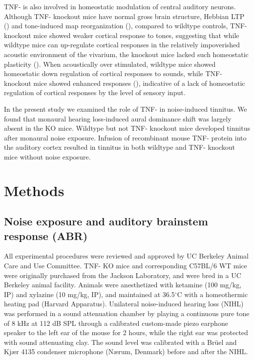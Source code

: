 TNF-\textalpha{} is also involved in homeostatic modulation of central auditory neurons. Although TNF-\textalpha{} knockout mice have normal gross brain structure, Hebbian LTP (\cite{Kaneko2008}) and tone-induced map reorganization (\cite{Yang2013}), compared to wildtype controls, TNF-\textalpha{} knockout mice showed weaker cortical response to tones, suggesting that while wildtype mice can up-regulate cortical responses in the relatively impoverished acoustic environment of the vivarium, the knockout mice lacked such homeostatic plasticity (\cite{Yang2013}). When acoustically over stimulated, wildtype mice showed homeostatic down regulation of cortical responses to sounds, while TNF-\textalpha{} knockout mice showed enhanced responses (\cite{Yang2013}), indicative of a lack of homeostatic regulation of cortical responses by the level of sensory input.

In the present study we examined the role of TNF-\textalpha{} in noise-induced tinnitus. We found that monaural hearing loss-induced aural dominance shift was largely absent in the KO mice. Wildtype but not TNF-\textalpha{} knockout mice developed tinnitus after monaural noise exposure. Infusion of recombinant mouse TNF-\textalpha{} protein into the auditory cortex resulted in tinnitus in both wildtype and TNF-\textalpha{} knockout mice without noise exposure.

\section{Methods}

\subsection{Noise exposure and auditory brainstem response (ABR)}
All experimental procedures were reviewed and approved by UC Berkeley Animal Care and Use Committee. TNF-\textalpha{} KO mice and corresponding C57BL/6 WT mice were originally purchased from the Jackson Laboratory, and were bred in a UC Berkeley animal facility. Animals were anesthetized with ketamine (100 mg/kg, IP) and xylazine (10 mg/kg, IP), and maintained at 36.5$^\circ$C with a homeothermic heating pad (Harvard Apparatus). Unilateral noise-induced hearing loss (NIHL) was performed in a sound attenuation chamber by playing a continuous pure tone of 8 kHz at 112 dB SPL through a calibrated custom-made piezo earphone speaker to the left ear of the mouse for 2 hours, while the right ear was protected with sound attenuating clay. The sound level was calibrated with a Br\"uel and Kj\ae r 4135 condenser microphone (N\ae rum, Denmark) before and after the NIHL.

